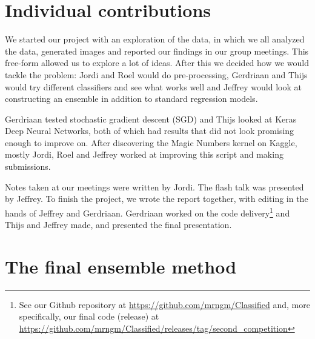 \documentclass[a4paper,11pt,twocolumn]{article}
\begin{document}
\newpage

\onecolumn
\section{Individual contributions}
We started our project with an exploration of the data, in which we all analyzed
the data, generated images and reported our findings in our group meetings. This
free-form allowed us to explore a lot of ideas. After this we decided how we
would tackle the problem: Jordi and Roel would do pre-processing, Gerdriaan and
Thijs would try different classifiers and see what works well and Jeffrey would
look at constructing an ensemble in addition to standard regression models.

Gerdriaan tested stochastic gradient descent (SGD) and Thijs looked at Keras
Deep Neural Networks, both of which had results that did not look promising
enough to improve on. After discovering the Magic Numbers kernel on Kaggle,
mostly Jordi, Roel and Jeffrey worked at improving this script and making
submissions.

Notes taken at our meetings were written by Jordi. The flash talk was presented
by Jeffrey. To finish the project, we wrote the report together, with editing in
the hands of Jeffrey and Gerdriaan. Gerdriaan worked on the code
delivery\footnote{See our Github repository at
\url{https://github.com/mrngm/Classified} and, more specifically, our final code
(release) at
\url{https://github.com/mrngm/Classified/releases/tag/second\_competition}} and
Thijs and Jeffrey made, and presented the final presentation.

\clearpage

\appendix
\section{The final ensemble method}
\label{app:final}
\end{document}
